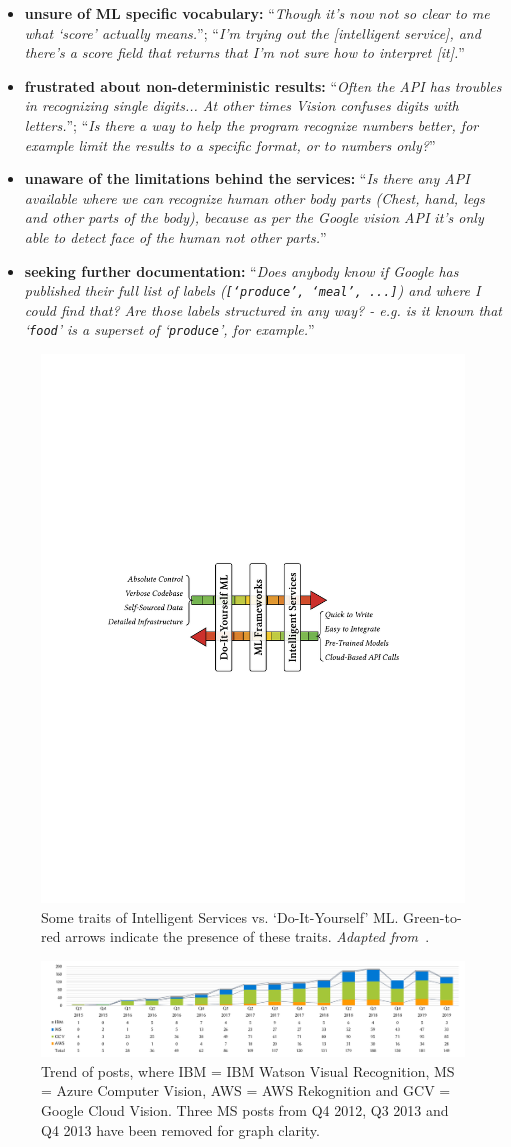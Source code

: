 \begin{itemize}
  \item \textbf{unsure of ML specific vocabulary:} ``\textit{Though it's now not so clear to me what `score' actually means.}''; ``\textit{I'm trying out the [intelligent service], and there's a score field that returns that I'm not sure how to interpret [it].}''
  \item \textbf{frustrated about non-deterministic results:} ``\textit{Often the API has troubles in recognizing single digits... At other times Vision confuses digits with letters.}''; ``\textit{Is there a way to help the program recognize numbers better, for example limit the results to a specific format, or to numbers only?}''
  \item \textbf{unaware of the limitations behind the services:} ``\textit{Is there any API available where we can recognize human other body parts (Chest, hand, legs and other parts of the body), because as per the Google vision API it's only able to detect face of the human not other parts.}''
  \item \textbf{seeking further documentation:} ``\textit{Does anybody know if Google has published their full list of labels (\texttt{[`produce', `meal', ...]}) and where I could find that? Are those labels structured in any way? - e.g. is it known that `\texttt{food}' is a superset of `\texttt{produce}', for example.}''
\end{itemize}


\begin{figure}
  \centering
  \includegraphics[width=\linewidth,height=.37\linewidth]{traits}
  \caption{Some traits of Intelligent Services vs. `Do-It-Yourself' ML. Green-to-red arrows indicate the presence of these traits. \textit{Adapted from~\citet{Ortiz:2017wg}}.}
  \label{icse2020:fig:traits}
\end{figure}

\begin{figure}[tb]
  \includegraphics[width=\linewidth]{posts-trend}
  \caption{Trend of posts, where IBM = IBM Watson Visual Recognition, MS = Azure Computer Vision, AWS = AWS Rekognition and GCV = Google Cloud Vision. Three MS posts from Q4 2012, Q3 2013 and Q4 2013 have been removed for graph clarity.}
  \label{icse2020:fig:posts-trend}
\end{figure}

